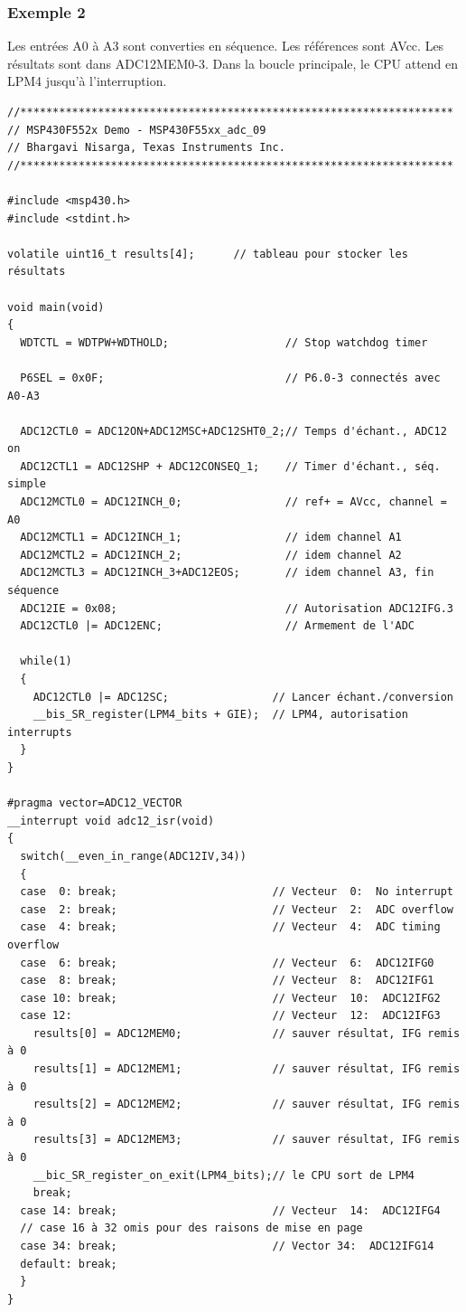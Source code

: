 \begin{minipage}{16cm}{
\subsubsection*{Exemple 2}
Les entrées A0 à A3 sont converties en séquence. Les références sont AVcc.
Les résultats sont dans ADC12MEM0-3. Dans la boucle principale, le CPU attend en LPM4 jusqu'à l'interruption.

\lstset{style=customc}
\begin{lstlisting}
//*******************************************************************
// MSP430F552x Demo - MSP430F55xx_adc_09
// Bhargavi Nisarga, Texas Instruments Inc.
//*******************************************************************

#include <msp430.h>
#include <stdint.h>

volatile uint16_t results[4];      // tableau pour stocker les résultats

void main(void)
{
  WDTCTL = WDTPW+WDTHOLD;                  // Stop watchdog timer

  P6SEL = 0x0F;                            // P6.0-3 connectés avec A0-A3

  ADC12CTL0 = ADC12ON+ADC12MSC+ADC12SHT0_2;// Temps d'échant., ADC12 on
  ADC12CTL1 = ADC12SHP + ADC12CONSEQ_1;    // Timer d'échant., séq. simple
  ADC12MCTL0 = ADC12INCH_0;                // ref+ = AVcc, channel = A0
  ADC12MCTL1 = ADC12INCH_1;                // idem channel A1
  ADC12MCTL2 = ADC12INCH_2;                // idem channel A2
  ADC12MCTL3 = ADC12INCH_3+ADC12EOS;       // idem channel A3, fin séquence
  ADC12IE = 0x08;                          // Autorisation ADC12IFG.3
  ADC12CTL0 |= ADC12ENC;                   // Armement de l'ADC

  while(1)
  {
    ADC12CTL0 |= ADC12SC;                // Lancer échant./conversion
    __bis_SR_register(LPM4_bits + GIE);  // LPM4, autorisation interrupts
  }
}

#pragma vector=ADC12_VECTOR
__interrupt void adc12_isr(void)
{
  switch(__even_in_range(ADC12IV,34))
  {
  case  0: break;                        // Vecteur  0:  No interrupt
  case  2: break;                        // Vecteur  2:  ADC overflow
  case  4: break;                        // Vecteur  4:  ADC timing overflow
  case  6: break;                        // Vecteur  6:  ADC12IFG0
  case  8: break;                        // Vecteur  8:  ADC12IFG1
  case 10: break;                        // Vecteur  10:  ADC12IFG2
  case 12:                               // Vecteur  12:  ADC12IFG3
    results[0] = ADC12MEM0;              // sauver résultat, IFG remis à 0
    results[1] = ADC12MEM1;              // sauver résultat, IFG remis à 0
    results[2] = ADC12MEM2;              // sauver résultat, IFG remis à 0
    results[3] = ADC12MEM3;              // sauver résultat, IFG remis à 0
    __bic_SR_register_on_exit(LPM4_bits);// le CPU sort de LPM4
    break;
  case 14: break;                        // Vecteur  14:  ADC12IFG4
  // case 16 à 32 omis pour des raisons de mise en page
  case 34: break;                        // Vector 34:  ADC12IFG14
  default: break; 
  }
}
\end{lstlisting}
}
\end{minipage}
